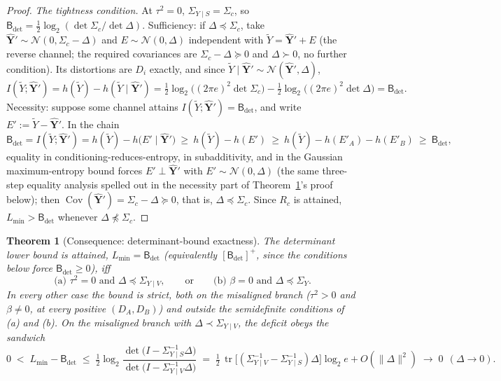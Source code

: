 ﻿\documentclass[11pt,onecolumn]{IEEEtran}
\newtheorem{theorem}{Theorem}
\newcommand{\tr}{\operatorname{tr}}
\newcommand{\Cov}{\operatorname{Cov}}
\newcommand{\Bdet}{\mathsf{B}_{\det}}
\begin{document}
\begin{proof}
\emph{The tightness condition.} At $\tau^2=0$,
$\Sigma_{Y\mid S}=\Sigma_c$, so $\Bdet=\tfrac12\log_2(\det\Sigma_c/
\det\Delta)$. Sufficiency: if $\Delta\preceq\Sigma_c$, take
$\hat{\mathbf Y}'\sim\mathcal N(0,\Sigma_c-\Delta)$ and
$E\sim\mathcal N(0,\Delta)$ independent with
$\widetilde Y=\hat{\mathbf Y}'+E$ (the reverse channel; the required
covariances are $\Sigma_c-\Delta\succeq0$ and $\Delta\succ0$, no
further condition). Its distortions are $D_i$ exactly, and since
$\widetilde Y\mid\hat{\mathbf Y}'\sim\mathcal N(\hat{\mathbf
Y}',\Delta)$,
\[
I(\widetilde Y;\hat{\mathbf Y}')
=h(\widetilde Y)-h(\widetilde Y\mid\hat{\mathbf Y}')
=\tfrac12\log_2\bigl((2\pi e)^2\det\Sigma_c\bigr)
-\tfrac12\log_2\bigl((2\pi e)^2\det\Delta\bigr)
=\Bdet .
\]
Necessity: suppose some channel attains
$I(\widetilde Y;\hat{\mathbf Y}')=\Bdet$, and write
$E':=\widetilde Y-\hat{\mathbf Y}'$. In the chain
\[
\Bdet=I(\widetilde Y;\hat{\mathbf Y}')
=h(\widetilde Y)-h\bigl(E'\mid\hat{\mathbf Y}'\bigr)
\ \ge\ h(\widetilde Y)-h(E')
\ \ge\ h(\widetilde Y)-h(E'_A)-h(E'_B)
\ \ge\ \Bdet,
\]
equality in conditioning-reduces-entropy, in subadditivity, and in the
Gaussian maximum-entropy bound forces $E'\perp\hat{\mathbf Y}'$ with
$E'\sim\mathcal N(0,\Delta)$ (the same three-step equality analysis
spelled out in the necessity part of Theorem~\ref{thm:floor}'s proof
below); then
$\Cov(\hat{\mathbf Y}')=\Sigma_c-\Delta\succeq0$, that is,
$\Delta\preceq\Sigma_c$. Since $R_c$ is attained, $L_{\min}>\Bdet$
whenever $\Delta\not\preceq\Sigma_c$.
\end{proof}

\begin{theorem}[Consequence: determinant-bound exactness]\label{thm:floor}
The determinant lower bound is attained, $L_{\min}=\Bdet$ (equivalently
$[\Bdet]^{+}$, since the conditions below force $\Bdet\ge0$), iff
\[
\text{(a) } \tau^2=0 \text{ and } \Delta\preceq\Sigma_{Y\mid V},
\qquad\text{or}\qquad
\text{(b) } \beta=0 \text{ and } \Delta\preceq\Sigma_Y .
\]
In every other case the bound is strict, both on the misaligned branch
($\tau^2>0$ and $\beta\ne0$, at every positive $(D_A,D_B)$) and outside
the semidefinite conditions of (a) and (b). On the misaligned branch with
$\Delta\prec\Sigma_{Y\mid V}$, the deficit obeys the sandwich
\[
0\;<\;L_{\min}-\Bdet\;\le\;
\tfrac12\log_2\frac{\det\bigl(I-\Sigma_{Y\mid S}^{-1}\Delta\bigr)}
{\det\bigl(I-\Sigma_{Y\mid V}^{-1}\Delta\bigr)}
\;=\;\tfrac12\,\tr\bigl[(\Sigma_{Y\mid V}^{-1}-\Sigma_{Y\mid S}^{-1})
\Delta\bigr]\log_2 e+O(\|\Delta\|^2)\;\longrightarrow\;0
\ \ (\Delta\to0).
\]
\end{theorem}
\end{document}
